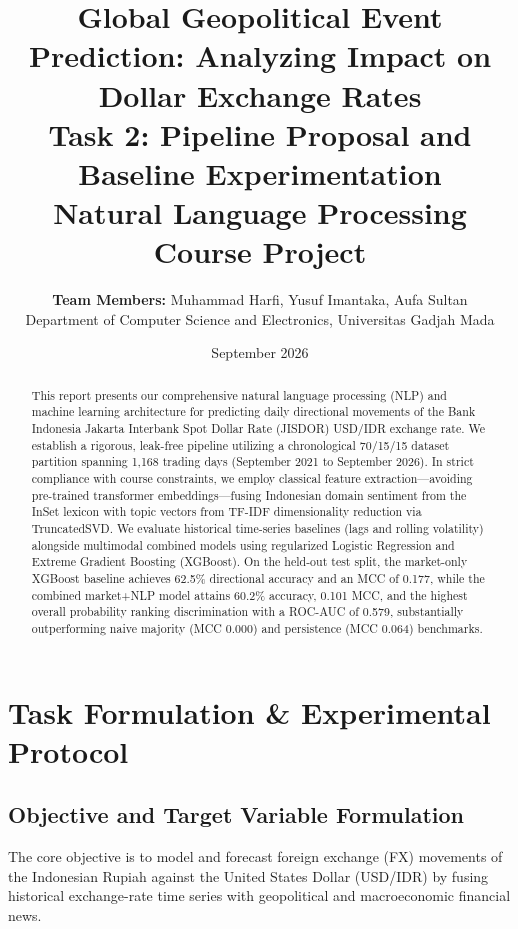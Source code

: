 \documentclass[10pt,a4paper]{article}
\title{\vspace{-1.2cm}\textbf{\Large Global Geopolitical Event Prediction: Analyzing Impact on Dollar Exchange Rates}\\[0.25em]
\large\textbf{Task 2: Pipeline Proposal and Baseline Experimentation}\\[0.2em]
\normalsize Natural Language Processing Course Project}
\author{\textbf{Team Members:} Muhammad Harfi, Yusuf Imantaka, Aufa Sultan \\
Department of Computer Science and Electronics, Universitas Gadjah Mada}
\date{September 2026}
\begin{document}
\maketitle
\thispagestyle{fancy}

\begin{abstract}
\noindent This report presents our comprehensive natural language processing (NLP) and machine learning architecture for predicting daily directional movements of the Bank Indonesia Jakarta Interbank Spot Dollar Rate (JISDOR) USD/IDR exchange rate. We establish a rigorous, leak-free pipeline utilizing a chronological 70/15/15 dataset partition spanning 1,168 trading days (September 2021 to September 2026). In strict compliance with course constraints, we employ classical feature extraction—avoiding pre-trained transformer embeddings—fusing Indonesian domain sentiment from the InSet lexicon with topic vectors from TF-IDF dimensionality reduction via TruncatedSVD. We evaluate historical time-series baselines (lags and rolling volatility) alongside multimodal combined models using regularized Logistic Regression and Extreme Gradient Boosting (XGBoost). On the held-out test split, the market-only XGBoost baseline achieves 62.5\% directional accuracy and an MCC of 0.177, while the combined market+NLP model attains 60.2\% accuracy, 0.101 MCC, and the highest overall probability ranking discrimination with a ROC-AUC of 0.579, substantially outperforming naive majority (MCC 0.000) and persistence (MCC 0.064) benchmarks.
\end{abstract}

\vspace{-0.5em}

\section{Task Formulation \& Experimental Protocol}

\subsection{Objective and Target Variable Formulation}
The core objective is to model and forecast foreign exchange (FX) movements of the Indonesian Rupiah against the United States Dollar (USD/IDR) by fusing historical exchange-rate time series with geopolitical and macroeconomic financial news.
\end{document}
